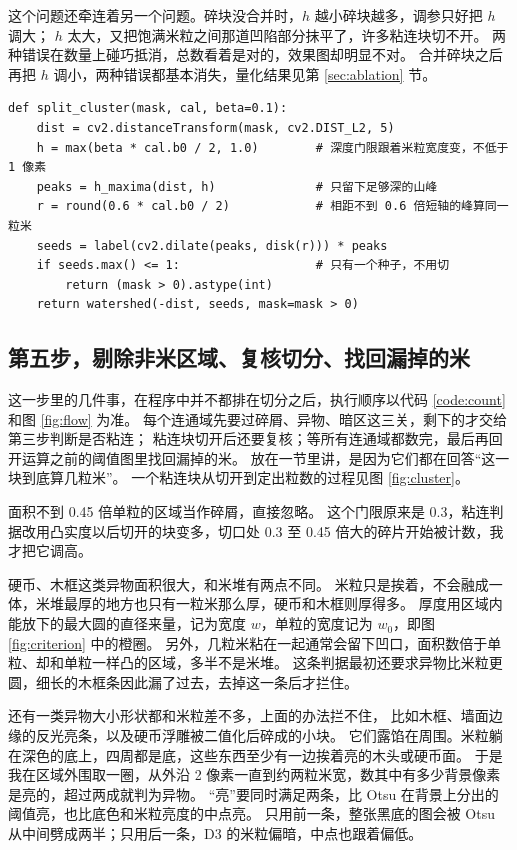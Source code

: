 这个问题还牵连着另一个问题。碎块没合并时，$h$ 越小碎块越多，调参只好把 $h$ 调大；
$h$ 太大，又把饱满米粒之间那道凹陷部分抹平了，许多粘连块切不开。
两种错误在数量上碰巧抵消，总数看着是对的，效果图却明显不对。
合并碎块之后再把 $h$ 调小，两种错误都基本消失，量化结果见第 \ref{sec:ablation} 节。

\begin{lstlisting}[float=!htbp, caption={放种子并做注水分割}, label={code:split}]
def split_cluster(mask, cal, beta=0.1):
    dist = cv2.distanceTransform(mask, cv2.DIST_L2, 5)
    h = max(beta * cal.b0 / 2, 1.0)        # 深度门限跟着米粒宽度变，不低于 1 像素
    peaks = h_maxima(dist, h)              # 只留下足够深的山峰
    r = round(0.6 * cal.b0 / 2)            # 相距不到 0.6 倍短轴的峰算同一粒米
    seeds = label(cv2.dilate(peaks, disk(r))) * peaks
    if seeds.max() <= 1:                   # 只有一个种子，不用切
        return (mask > 0).astype(int)
    return watershed(-dist, seeds, mask=mask > 0)
\end{lstlisting}

\subsection{第五步，剔除非米区域、复核切分、找回漏掉的米}
\label{sec:correct}

这一步里的几件事，在程序中并不都排在切分之后，执行顺序以代码 \ref{code:count} 和图 \ref{fig:flow} 为准。
每个连通域先要过碎屑、异物、暗区这三关，剩下的才交给第三步判断是否粘连；
粘连块切开后还要复核；等所有连通域都数完，最后再回开运算之前的阈值图里找回漏掉的米。
放在一节里讲，是因为它们都在回答“这一块到底算几粒米”。
一个粘连块从切开到定出粒数的过程见图 \ref{fig:cluster}。

面积不到 0.45 倍单粒的区域当作碎屑，直接忽略。
这个门限原来是 0.3，粘连判据改用凸实度以后切开的块变多，切口处 0.3 至 0.45 倍大的碎片开始被计数，我才把它调高。

硬币、木框这类异物面积很大，和米堆有两点不同。
米粒只是挨着，不会融成一体，米堆最厚的地方也只有一粒米那么厚，硬币和木框则厚得多。
厚度用区域内能放下的最大圆的直径来量，记为宽度 $w$，单粒的宽度记为 $w_0$，即图 \ref{fig:criterion} 中的橙圈。
另外，几粒米粘在一起通常会留下凹口，面积数倍于单粒、却和单粒一样凸的区域，多半不是米堆。
这条判据最初还要求异物比米粒更圆，细长的木框条因此漏了过去，去掉这一条后才拦住。

还有一类异物大小形状都和米粒差不多，上面的办法拦不住，
比如木框、墙面边缘的反光亮条，以及硬币浮雕被二值化后碎成的小块。
它们露馅在周围。米粒躺在深色的底上，四周都是底，这些东西至少有一边挨着亮的木头或硬币面。
于是我在区域外围取一圈，从外沿 2 像素一直到约两粒米宽，数其中有多少背景像素是亮的，超过两成就判为异物。
“亮”要同时满足两条，比 Otsu 在背景上分出的阈值亮，也比底色和米粒亮度的中点亮。
只用前一条，整张黑底的图会被 Otsu 从中间劈成两半；只用后一条，D3 的米粒偏暗，中点也跟着偏低。


